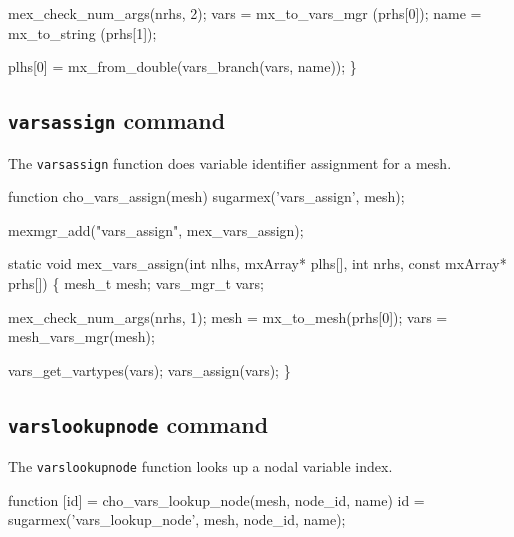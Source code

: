     mex_check_num_args(nrhs, 2);
    vars    = mx_to_vars_mgr    (prhs[0]);
    name    = mx_to_string      (prhs[1]);

    plhs[0] = mx_from_double(vars_branch(vars, name));
\}

\nwendcode{}\nwdocspar


\subsection{{\tt{}vars{}assign} command}

The {\tt{}vars{}assign} function does variable identifier assignment
for a mesh.

\nwenddocs{}\endmoddef
function cho_vars_assign(mesh)
sugarmex('vars_assign', mesh);
\nwendcode{}\nwdocspar

\nwenddocs{}\plusendmoddef
mexmgr_add("vars_assign", mex_vars_assign);
\nwendcode{}\nwdocspar

\nwenddocs{}\plusendmoddef
static void mex_vars_assign(int nlhs, mxArray* plhs[],
                            int nrhs, const mxArray* prhs[])
\{
    mesh_t     mesh;
    vars_mgr_t vars;

    mex_check_num_args(nrhs, 1);
    mesh = mx_to_mesh(prhs[0]);
    vars = mesh_vars_mgr(mesh);

    vars_get_vartypes(vars);
    vars_assign(vars);
\}

\nwendcode{}\nwdocspar
 

\subsection{{\tt{}vars{}lookup{}node} command}

The {\tt{}vars{}lookup{}node} function looks up a nodal variable index.

\nwenddocs{}\endmoddef
function [id] = cho_vars_lookup_node(mesh, node_id, name)
id = sugarmex('vars_lookup_node', mesh, node_id, name);
\nwendcode{}\nwdocspar

